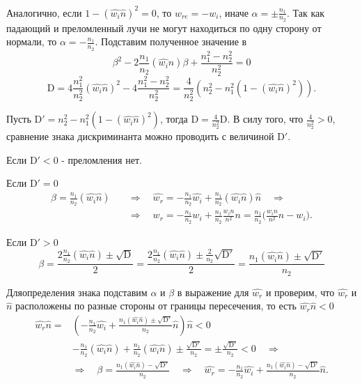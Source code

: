 Аналогично, если $1 - (\widehat{w_i} \widehat{n})^2 = 0$, то $w_{re} = -w_i$,
иначе $\alpha = \pm\frac{n_1}{n_2}$. Так как падающий и преломленный лучи не могут
находиться по одну сторону от нормали, то $\alpha = - \frac{n_1}{n_2}$.
Подставим полученное значение в 
\begin{equation*}
    \beta^2 - 2 \frac{n_1}{n_2}(\widehat{w_i}\widehat{n})\beta + \frac{n_1^2 - n_2^2}{n_2^2} = 0
\end{equation*}
\begin{equation*}
    \mathrm{D} = 4 \frac{n_1^2}{n_2^2}(\widehat{w_i} \widehat{n})^2 - 4 \frac{n_1^2 - n_2^2}{n_2^2}
               = \frac{4}{n_2^2}(n_2^2 - n_1^2(1 - (\widehat{w_i}\widehat{n})^2)).
\end{equation*}

Пусть $\mathrm{D'} = n_2^2 - n_1^2(1 - (\widehat{w_i}\widehat{n})^2)$, тогда
$\mathrm{D} = \frac{4}{n_2^2}\mathrm{D}$. В силу того, что $\frac{4}{n_2^2} > 0$,
сравнение знака дискриминанта можно проводить с величиной $\mathrm{D'}$.

Если $\mathrm{D'} < 0$ - преломления нет.

Если $\mathrm{D'} = 0$
\begin{align}
    \beta = \frac{n_1}{n_2}(\widehat{w_i}\widehat{n}) \quad &
    \Rightarrow\quad \widehat{w_r} = -\frac{n_1}{n_2}\widehat{w_i} + \frac{n_1}{n_2}(\widehat{w_i}\widehat{n}) \widehat{n} \quad\Rightarrow \nonumber \\
    & \Rightarrow\quad w_r = -\frac{n_1}{n_2} w_i + \frac{n_1}{n_2}\frac{w_i n}{n^2}n = \frac{n_1}{n_2}\Big( \frac{w_i n}{n^2}n - w_i\Big).
\end{align}

Если $\mathrm{D'} > 0$
\begin{equation*}
    \beta = \frac{2 \frac{n_1}{n_2}(\widehat{w_i}\widehat{n}) \pm \sqrt{\mathrm{D}}}{2}
          = \frac{2 \frac{n_1}{n_2}(\widehat{w_i}\widehat{n}) \pm \frac{2}{n_2}\sqrt{\mathrm{D'}}}{2}
          = \frac{n_1(\widehat{w_i}\widehat{n}) \pm \sqrt{\mathrm{D'}}}{n_2}
\end{equation*}

Дляопределения знака подставим $\alpha$ и $\beta$ в выражение для $\widehat{w_r}$ и
проверим, что $\widehat{w_r}$ и $\widehat{n}$ расположены по разные стороны от
границы пересечения, то есть $\widehat{w_r} \widehat{n} < 0$
\begin{align*}
    \widehat{w_r} \widehat{n} = & (-\frac{n_1}{n_2}\widehat{w_i} + \frac{n_1(\widehat{w_i}\widehat{n}) \pm \sqrt{\mathrm{D'}}}{n_2}\widehat{n})\widehat{n} < 0 \\
    & -\frac{n_1}{n_2}(\widehat{w_i}\widehat{n}) + \frac{n_1}{n_2}(\widehat{w_i}\widehat{n}) \pm \frac{\sqrt{\mathrm{D'}}}{n_2} = \pm \frac{\sqrt{\mathrm{D'}}}{n_2} < 0 \quad\Rightarrow \\
    & \Rightarrow\quad \beta = \frac{n_1(\widehat{w_i}\widehat{n}) - \sqrt{\mathrm{D'}}}{n_2} \quad\Rightarrow\quad
      \widehat{w_r} = -\frac{n_1}{n_2}\widehat{w_i} + \frac{n_1(\widehat{w_i} \widehat{n}) - \sqrt{\mathrm{D'}}}{n_2}\widehat{n}.
\end{align*}

